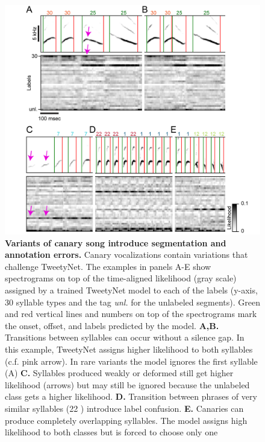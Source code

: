 \documentclass[10pt,letterpaper]{article}
\begin{document}
\begin{table}[h!]
\label{table:1}
\end{table}


\begin{figure}[!ht]
\includegraphics[scale=1.0]{Figures/fig7/fig7_model_err_examples.png}
\caption{{\bf Variants of canary song introduce segmentation and annotation errors.}
Canary vocalizations contain variations that challenge TweetyNet. The examples in panels A-E show spectrograms on top of the time-aligned likelihood (gray scale) assigned by a trained TweetyNet model to each of the labels (y-axis, 30 syllable types and the tag \textit{unl.} for the unlabeled segments). Green and red vertical lines and numbers on top of the spectrograms mark the onset, offset, and labels predicted by the model. 
\textbf{A,B.} Transitions between syllables can occur without a silence gap. In this example, TweetyNet assigns higher likelihood to both syllables (c.f. pink arrow). In rare variants the model ignores the first syllable (A)      
\textbf{C.} Syllables produced weakly or deformed still get higher likelihood (arrows) but may still be ignored because the unlabeled class gets a higher likelihood.
\textbf{D.} Transition between phrases of very similar syllables (22 ) introduce label confusion.
\textbf{E.} Canaries can produce completely overlapping syllables. The model assigns high likelihood to both classes but is forced to choose only one}
\label{fig7}
\end{figure}
\end{document}
